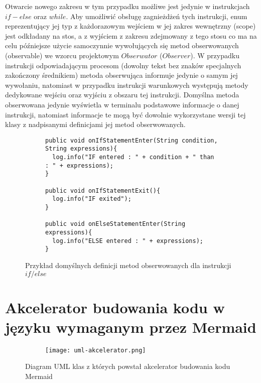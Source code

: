 	 Otwarcie nowego zakresu w tym przypadku możliwe jest jedynie w instrukcjach $if - else$ oraz $while$. Aby umożliwić obsługę zagnieżdżeń tych instrukcji, enum reprezentujący jej typ z każdorazowym wejściem w jej zakres wewnętrzny (scope) jest odkładany na stos, a z wyjściem z zakresu zdejmowany z tego stosu co ma na celu późniejsze użycie samoczynnie wywołujących się metod obserwowanych (observable) we wzorcu projektowym $Obserwator$ ($Observer$). W przypadku instrukcji odpowiadającym procesom (dowolny tekst bez znaków specjalnych zakończony średnikiem) metoda obserwująca informuje jedynie o samym jej wywołaniu, natomiast w przypadku instrukcji warunkowych występują metody dedykowane wejściu oraz wyjściu z obszaru tej instrukcji. Domyślna metoda obserwowana jedynie wyświetla w terminalu podstawowe informacje o danej instrukcji, natomiast informacje te mogą być dowolnie wykorzystane wersji tej klasy z nadpisanymi definicjami jej metod obserwowanych. 
						
\begin{figure}[H]
  \begin{subfigure}{\textwidth}
		\begin{verbatim}
public void onIfStatementEnter(String condition, String expressions){
  log.info("IF entered : " + condition + " than : " + expressions);
}

public void onIfStatementExit(){
  log.info("IF exited");
}

public void onElseStatementEnter(String expressions){
  log.info("ELSE entered : " + expressions);
}
		\end{verbatim}
  \end{subfigure}\hfill
  \caption{Przykład domyślnych definicji metod obserwowanych dla instrukcji $if/else$}
\end{figure}



\section{Akcelerator budowania kodu w języku wymaganym przez Mermaid}

\begin{figure}[H]
  \begin{subfigure}{\textwidth}
  	\centering
    \texttt{[image: uml-akcelerator.png]}
  \end{subfigure}\hfill
  \caption{Diagram UML klas z których powstał akcelerator budowania kodu Mermaid }
\end{figure}

